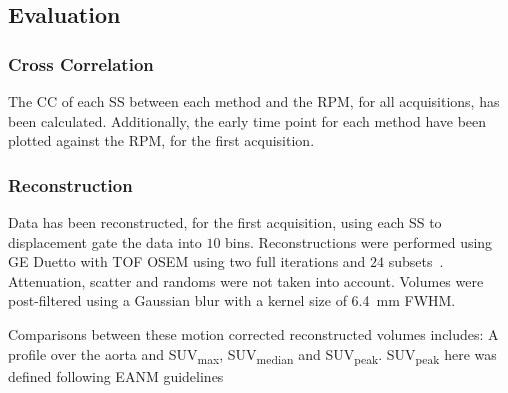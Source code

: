             \subsection{Evaluation} \label{sec:pca_data_driven_surrogate_signal_extraction_methods_for_dynamic_pet_methods_evaluation}
                \subsubsection{Cross Correlation} \label{sec:pca_data_driven_surrogate_signal_extraction_methods_for_dynamic_pet_methods_cross_correlation}
                    The \gls{CC} of each \gls{SS} between each method and the \gls{RPM}, for all acquisitions, has been calculated. Additionally, the early time point  for each method have been plotted against the \gls{RPM}, for the first acquisition.
                
                \subsubsection{Reconstruction} \label{sec:pca_data_driven_surrogate_signal_extraction_methods_for_dynamic_pet_methods_reconstruction}
                    Data has been reconstructed, for the first acquisition, using each \gls{SS} to displacement gate the data into $10$ bins. Reconstructions were performed using \gls{GE} Duetto with \gls{TOF} \gls{OSEM} using two full iterations and $24$ subsets~\cite{Hudson1994}.
                    Attenuation, scatter and randoms were not taken into account. Volumes were post-filtered using a Gaussian blur with a kernel size of \SI{6.4}{\milli\metre} \gls{FWHM}.
                    
                    Comparisons between these motion corrected reconstructed volumes includes: A profile over the aorta and \gls{SUV}\textsubscript{max}, \gls{SUV}\textsubscript{median} and \gls{SUV}\textsubscript{peak}. \gls{SUV}\textsubscript{peak} here was defined following \gls{EANM} guidelines~\cite{Boellaard2015FDG2.0}
            
